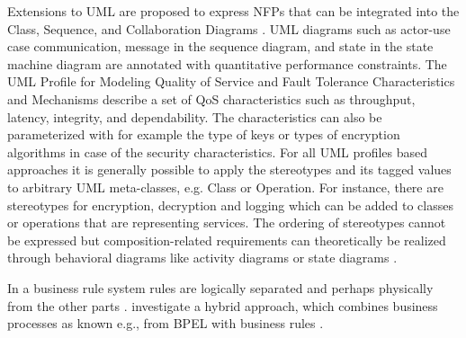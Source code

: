 Extensions to UML are proposed to express NFPs that can be integrated into the Class, Sequence, and Collaboration Diagrams \cite{CyPr04}.    UML diagrams such as actor-use case communication, message in the sequence diagram, and state in the state machine diagram are annotated with quantitative performance constraints. The UML Profile for Modeling Quality of Service and Fault Tolerance Characteristics and Mechanisms \cite{Omg04} describe a set of QoS characteristics such as throughput, latency, integrity, and dependability. The characteristics can also be parameterized with for example the type of keys or types of encryption algorithms in case of the security characteristics. For all UML profiles based approaches it is generally possible to apply the stereotypes and its tagged values to arbitrary UML meta-classes, e.g. Class or Operation. For instance, there are stereotypes for encryption, decryption and logging which can be added to classes or operations that are representing services. The ordering of stereotypes cannot be expressed but composition-related requirements can theoretically be realized through behavioral diagrams like activity diagrams or state diagrams \cite{OrHe07}.



In a business rule system  rules are logically separated  and perhaps physically from the other parts \cite{ChMe04}. \cite{ChMe04} investigate a hybrid approach, which combines business processes as known e.g., from BPEL with business rules \cite{Hay00}.

